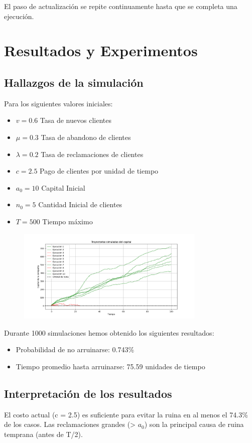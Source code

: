\documentclass[12pt, a4paper]{article}
\begin{document}
El paso de actualización se repite continuamente hasta que se completa una ejecución.

\section{Resultados y Experimentos} 
\subsection*{Hallazgos de la simulación}
Para los siguientes valores iniciales:
\begin{itemize}
   \item $v=0.6$ Tasa de nuevos clientes
   \item $\mu=0.3$ Tasa de abandono de clientes
   \item $\lambda = 0.2$ Tasa de reclamaciones de clientes
   \item $c=2.5$ Pago de clientes por unidad de tiempo
   \item $a_0=10$ Capital Inicial
   \item $n_0=5$ Cantidad Inicial de clientes
   \item $T=500$ Tiempo máximo
\end{itemize}
\begin{figure}[h]
    \centering
    \includegraphics[width=0.8\textwidth]{Figure_1.png}

    \label{fig:1}
\end{figure}
Durante 1000 simulaciones hemos obtenido los siguientes resultados:
\begin{itemize}
    \item Probabilidad de no arruinarse: 0.743\%
    \item Tiempo promedio hasta arruinarse: 75.59 unidades de tiempo
\end{itemize}
\subsection*{Interpretación de los resultados}
El costo actual (c = 2.5) es suficiente para evitar la ruina en al menos el 74.3\% de los casos.
Las reclamaciones grandes (> $a_0$) son la principal causa de ruina temprana (antes de T/2).
\end{document}
